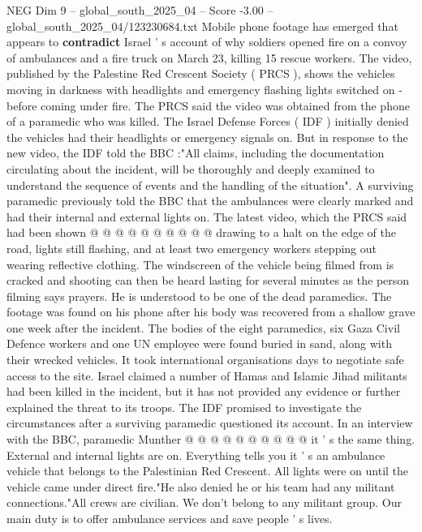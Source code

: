 \begin{textsample}{NEG Dim 9 – global\_south\_2025\_04 – Score -3.00 – global\_south\_2025\_04/123230684.txt}  \label{ex:f9_neg_266}
Mobile phone footage has emerged that appears to \textbf{contradict} Israel ' s account of why soldiers opened fire on a convoy of ambulances and a fire truck on March 23, killing 15 rescue workers.
The video, published by the Palestine Red Crescent Society ( PRCS ), shows the vehicles moving in darkness with headlights and emergency flashing lights switched on - before coming under fire.
The PRCS said the video was obtained from the phone of a paramedic who was killed.
The Israel Defense Forces ( IDF ) initially denied the vehicles had their headlights or emergency signals on.
But in response to the new video, the IDF told the BBC :"All claims, including the documentation circulating about the incident, will be thoroughly and deeply examined to understand the sequence of events and the handling of the situation".
A surviving paramedic previously told the BBC that the ambulances were clearly marked and had their internal and external lights on.
The latest video, which the PRCS said had been shown @ @ @ @ @ @ @ @ @ @ drawing to a halt on the edge of the road, lights still flashing, and at least two emergency workers stepping out wearing reflective clothing.
The windscreen of the vehicle being filmed from is cracked and shooting can then be heard lasting for several minutes as the person filming says prayers.
He is understood to be one of the dead paramedics.
The footage was found on his phone after his body was recovered from a shallow grave one week after the incident.
The bodies of the eight paramedics, six Gaza Civil Defence workers and one UN employee were found buried in sand, along with their wrecked vehicles.
It took international organisations days to negotiate safe access to the site.
Israel claimed a number of Hamas and Islamic Jihad militants had been killed in the incident, but it has not provided any evidence or further explained the threat to its troops.
The IDF promised to investigate the circumstances after a surviving paramedic questioned its account.
In an interview with the BBC, paramedic Munther @ @ @ @ @ @ @ @ @ @ it ' s the same thing.
External and internal lights are on.
Everything tells you it ' s an ambulance vehicle that belongs to the Palestinian Red Crescent.
All lights were on until the vehicle came under direct fire."He also denied he or his team had any militant connections."All crews are civilian.
We don't belong to any militant group.
Our main duty is to offer ambulance services and save people ' s lives.

\end{textsample}
